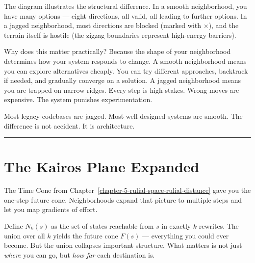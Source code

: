\begin{center}
\end{center}

The diagram illustrates the structural difference. In a smooth neighborhood, you have many options --- eight directions, all valid, all leading to further options. In a jagged neighborhood, most directions are blocked (marked with $\times$), and the terrain itself is hostile (the zigzag boundaries represent high-energy barriers).

Why does this matter practically? Because the shape of your neighborhood determines how your system responds to change. A smooth neighborhood means you can explore alternatives cheaply. You can try different approaches, backtrack if needed, and gradually converge on a solution. A jagged neighborhood means you are trapped on narrow ridges. Every step is high-stakes. Wrong moves are expensive. The system punishes experimentation.

Most legacy codebases are jagged. Most well-designed systems are smooth. The difference is not accident. It is architecture.

\begin{center}\rule{0.5\linewidth}{0.5pt}\end{center}

\section{The Kairos Plane Expanded}
\label{7.4-kairos-plane-expanded}

The Time Cone from Chapter~\ref{chapter-5-rulial-space-rulial-distance} gave you the one-step future cone. Neighborhoods expand that picture to multiple steps and let you map gradients of effort.

Define $N_k(s)$ as the set of states reachable from $s$ in exactly $k$ rewrites. The union over all $k$ yields the future cone $F(s)$ --- everything you could ever become. But the union collapses important structure. What matters is not just \emph{where} you can go, but \emph{how far} each destination is.

